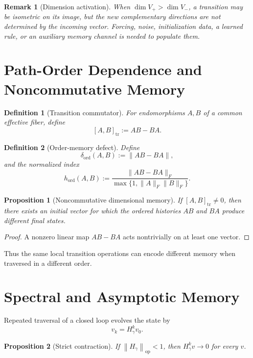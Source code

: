 \documentclass[11pt]{article}
\newtheorem{definition}{Definition}[section]
\newtheorem{proposition}{Proposition}[section]
\newtheorem{remark}{Remark}[section]
\newcommand{\opnorm}[1]{\left\lVert #1\right\rVert_{\mathrm{op}}}
\begin{document}
\begin{remark}[Dimension activation]
When $\dim V_+>\dim V_-$, a transition may be isometric on its image, but the
new complementary directions are not determined by the incoming vector.
Forcing, noise, initialization data, a learned rule, or an auxiliary memory
channel is needed to populate them.
\end{remark}

\section{Path-Order Dependence and Noncommutative Memory}
\label{sec:order}

\begin{definition}[Transition commutator]
For endomorphisms $A,B$ of a common effective fiber, define
\[
[A,B]_{\mathrm{tr}}:=AB-BA.
\]
\end{definition}

\begin{definition}[Order-memory defect]
Define
\[
\delta_{\mathrm{ord}}(A,B):=\|AB-BA\|,
\]
and the normalized index
\[
h_{\mathrm{ord}}(A,B)
:=\frac{\|AB-BA\|_F}
{\max\{1,\|A\|_F\|B\|_F\}}.
\]
\end{definition}

\begin{proposition}[Noncommutative dimensional memory]
If $[A,B]_{\mathrm{tr}}\ne0$, then there exists an initial vector for which
the ordered histories $AB$ and $BA$ produce different final states.
\end{proposition}

\begin{proof}
A nonzero linear map $AB-BA$ acts nontrivially on at least one vector.
\end{proof}

Thus the same local transition operations can encode different memory when
traversed in a different order.

\section{Spectral and Asymptotic Memory}
\label{sec:spectral}

Repeated traversal of a closed loop evolves the state by
\[
v_k=H_\gamma^k v_0.
\]

\begin{proposition}[Strict contraction]
If $\opnorm{H_\gamma}<1$, then $H_\gamma^k v\to0$ for every $v$.
\end{proposition}
\end{document}
